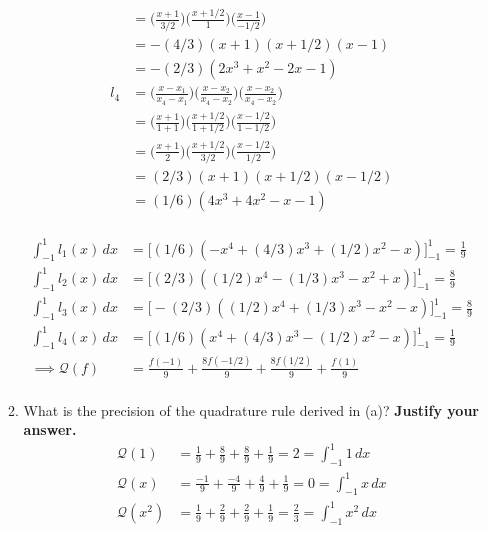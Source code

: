 \documentclass{article}
\begin{document}
\begin{enumerate}
\begin{enumerate}
\begin{multicols}{2}
\begin{align*}
                &= \Big( \frac{x + 1}{3/2}\Big)\Big( \frac{x + 1/2}{1}\Big)\Big( \frac{x - 1}{-1/2}\Big)\\ 
                &=-(4/3) ( x + 1)( x + 1/2)( x - 1)\\ 
                &= -(2/3)(2x^3+x^2-2x-1)\\ 
                l_4 &= \Big( \frac{x - x_1}{x_4 - x_1}\Big)\Big( \frac{x - x_2}{x_4 - x_2}\Big)\Big( \frac{x - x_2}{x_4 - x_2}\Big)\\ 
                &= \Big( \frac{x +1}{1 +1}\Big)\Big( \frac{x +1/2}{1 +1/2}\Big)\Big( \frac{x - 1/2}{1 - 1/2}\Big)\\ 
                &= \Big( \frac{x +1}{2}\Big)\Big( \frac{x +1/2}{3/2}\Big)\Big( \frac{x - 1/2}{1/2}\Big)\\ 
                &= (2/3)( x +1)( x +1/2)( x - 1/2)\\ 
                &= (1/6) (4x^3+4x^2-x-1)\\
            \end{align*} 
            \end{multicols}
            \begin{align*}
                \int_{-1}^1l_1(x) \, dx &= \Big[ (1/6)(-x^4 + (4/3)x^3 + (1/2)x^2 - x) \Big]_{-1}^1 = \frac{1}{9}\\
                \int_{-1}^1l_2(x) \, dx &= \Big[ (2/3)((1/2)x^4 -  (1/3)x^3 - x^2 + x) \Big]_{-1}^1 = \frac{8}{9}\\
                \int_{-1}^1l_3(x) \, dx &= \Big[ -(2/3)((1/2)x^4 +  (1/3)x^3 - x^2 - x) \Big]_{-1}^1 = \frac{8}{9}\\
                \int_{-1}^1l_4(x) \, dx &= \Big[ (1/6)(x^4 + (4/3)x^3 - (1/2)x^2 - x) \Big]_{-1}^1 = \frac{1}{9}\\
                \implies \mathcal{Q}(f) &= \frac{f(-1)}{9} + \frac{8f(-1/2)}{9} + \frac{8f(1/2)}{9} + \frac{f(1)}{9} \\
            \end{align*}
            \item What is the precision of the quadrature rule derived in (a)? \textbf{Justify your answer.}
            \begin{align*}
                \mathcal{Q}(1) &= \frac{1}{9} + \frac{8}{9} + \frac{8}{9} + \frac{1}{9} = 2  = \int_{-1}^{1} 1 \, dx \\
                \mathcal{Q}(x) &= \frac{-1}{9} + \frac{-4}{9} + \frac{4}{9} + \frac{1}{9} = 0 = \int_{-1}^1 x \, dx\\
                \mathcal{Q}(x^2) &= \frac{1}{9} + \frac{2}{9} + \frac{2}{9} + \frac{1}{9} = \frac{2}{3} = \int_{-1}^1 x^2\, dx \\

\end{align*}
\end{enumerate}
\end{enumerate}
\end{document}
